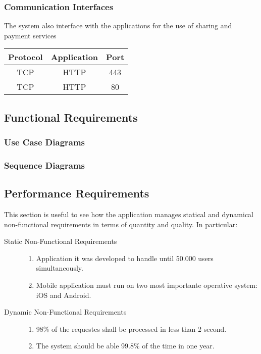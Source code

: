 	\subsubsection{Communication Interfaces}
		The system also interface with the applications for the use of sharing and payment services
		\hfill
		\begin{tabular}{| c | c | c |}
			\hline
			Protocol	& Application	& Port \\
			\hline
			\hline
			TCP		& HTTP		& 443 \\
			\hline
			TCP		& HTTP		& 80 \\
			\hline
		\end{tabular}
	
\subsection{Functional Requirements}
	
	
	\subsubsection{Use Case Diagrams}
		

	\subsubsection{Sequence Diagrams}
				
			
\subsection{Performance Requirements}
This section is useful to see how the application manages statical and dynamical non-functional requirements in terms of quantity and quality. 
	In particular:
	\begin{description}
		\item[Static Non-Functional Requirements]	\vfill
		\hfill
		\begin{enumerate}
			\item Application it was developed to handle until 50.000 users simultaneously.
			\item Mobile application must run on two most importante operative system: iOS and Android.
		\end{enumerate}
		
		\item[Dynamic Non-Functional Requirements] \vfill
		\hfill
		\begin{enumerate}
			\item 98\% of the requestes shall be processed in less than 2 second.
			\item The system should be able 99.8\% of the time in one year.
		\end{enumerate}			

	\end{description}
		
